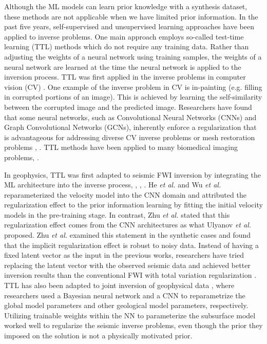 \documentclass[lettersize,journal]{IEEEtran}
\begin{document}
Although the ML models can learn prior knowledge with a synthesis dataset, these methods are not applicable when we have limited prior information. In the past five years, self-supervised and unsupervised learning approaches have been applied to inverse problems. One main approach employs so-called test-time learning (TTL) methods which do not require any training data. Rather than adjusting the weights of a neural network using training samples, the weights of a neural network are learned at the time the neural network is applied to the inversion process. TTL was first applied in the inverse problems in computer vision (CV) \cite{ref20}. One example of the inverse problem in CV is in-painting (e.g. filling in corrupted portions of an image). This is achieved by learning the self-similarity between the corrupted image and the predicted image. Researchers have found that some neural networks, such as Convolutional Neural Networks (CNNs) and Graph Convolutional Networks (GCNs), inherently enforce a regularization that is advantageous for addressing diverse CV inverse problems or mesh restoration problems \cite{ref6}, \cite{ref20}. TTL methods have been applied to many biomedical imaging problems\cite{ref16}, \cite{ref31}. 

In geophysics, TTL was first adapted to seismic FWI inversion by integrating the ML architecture into the inverse process\cite{ref7}, \cite{ref14}, \cite{ref15}, \cite{ref18}. He \textit{et al.} \cite{ref7} and Wu \textit{et al.} \cite{ref14} reparameterized the velocity model into the CNN domain and attributed the regularization effect to the prior information learning by fitting the initial velocity models in the pre-training stage. In contrast, Zhu \textit{et al.} \cite{ref18} stated that this regularization effect comes from the CNN architectures as what Ulyanov \textit{et al.} \cite{ref20} proposed. Zhu \textit{et al.} \cite{ref18} examined this statement in the synthetic cases and found that the implicit regularization effect is robust to noisy data. Instead of having a fixed latent vector as the input in the previous works, researchers have tried replacing the latent vector with the observed seismic data and achieved better inversion results than the conventional FWI with total variation regularization \cite{ref41}. TTL has also been adapted to joint inversion of geophysical data \cite{ref42}, where researchers used a Bayesian neural network and a CNN to reparametrize the global model parameters and other geological model parameters, respectively. Utilizing trainable weights within the NN to parameterize the subsurface model worked well to regularize the seismic inverse problems, even though the prior they imposed on the solution is not a physically motivated prior. 
\end{document}
